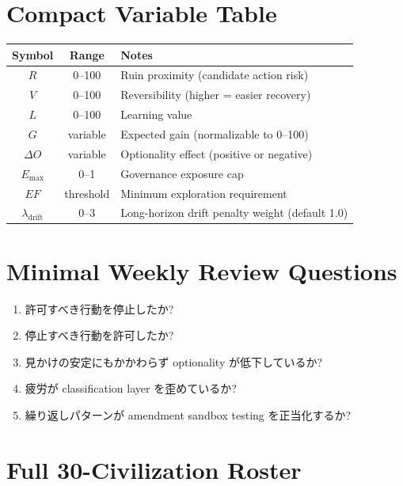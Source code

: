 \documentclass[11pt,a4paper]{article}
\theoremstyle{definition}\newtheorem{definition}{Definition}[section]
\begin{document}
\section{Compact Variable Table}

\begin{table}[H]\centering\small
\begin{tabular}{@{}ccp{5cm}@{}}\toprule
Symbol&Range&Notes\\\midrule
$R$&0--100&Ruin proximity (candidate action risk)\\
$V$&0--100&Reversibility (higher = easier recovery)\\
$L$&0--100&Learning value\\
$G$&variable&Expected gain (normalizable to 0--100)\\
$\Delta O$&variable&Optionality effect (positive or negative)\\
$E_{\max}$&0--1&Governance exposure cap\\
$EF$&threshold&Minimum exploration requirement\\
$\lambda_\text{drift}$&0--3&Long-horizon drift penalty weight (default 1.0)\\
\bottomrule\end{tabular}
\end{table}

\section{Minimal Weekly Review Questions}

\begin{enumerate}[leftmargin=2em]
  \item 許可すべき行動を停止したか?
  \item 停止すべき行動を許可したか?
  \item 見かけの安定にもかかわらず optionality が低下しているか?
  \item 疲労が classification layer を歪めているか?
  \item 繰り返しパターンが amendment sandbox testing を正当化するか?
\end{enumerate}

\section{Full 30-Civilization Roster}
\end{document}
